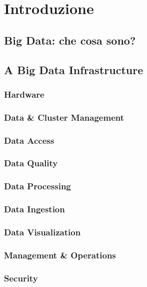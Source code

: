 \chapter{Introduzione}

\section{Big Data: che cosa sono?}

\section{A Big Data Infrastructure}\label{Chapter2}

\subsection{Hardware}

\subsection{Data \& Cluster Management}

\subsection{Data Access}

\subsection{Data Quality}

\subsection{Data Processing}

\subsection{Data Ingestion}

\subsection{Data Visualization}

\subsection{Management \& Operations}

\subsection{Security}
